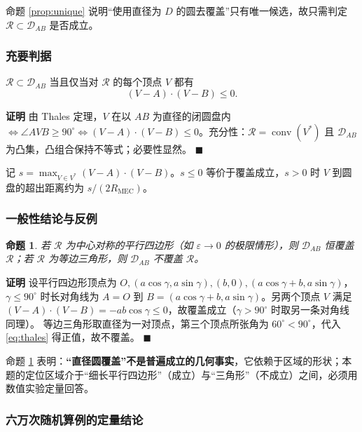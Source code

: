 \documentclass[withoutpreface,bwprint]{cumcmthesis}
\newtheorem{proposition}{\heiti 命题}
\newenvironment{pf}{\par\noindent\textbf{证明}\quad}{\hfill$\blacksquare$\par}
\begin{document}
命题 \ref{prop:unique} 说明“使用直径为 $D$ 的圆去覆盖”只有唯一候选，故只需判定 $\mathcal R\subset\mathcal D_{AB}$ 是否成立。

\subsubsection{充要判据}

\begin{theorem}[Thales 判据]\label{thm:thales}
$\mathcal R\subset\mathcal D_{AB}$ 当且仅当对 $\mathcal R$ 的每个顶点 $V$ 都有
\begin{equation}
(V-A)\cdot(V-B)\le0 .
\label{eq:thales}
\end{equation}
\end{theorem}
\begin{pf}
由 Thales 定理，$V$ 在以 $AB$ 为直径的闭圆盘内 $\iff\angle AVB\ge90^{\circ}\iff(V-A)\cdot(V-B)\le0$。充分性：$\mathcal R=\operatorname{conv}(V^*)$ 且 $\mathcal D_{AB}$ 为凸集，凸组合保持不等式；必要性显然。
\end{pf}

记 $s=\max_{V\in V^*}(V-A)\cdot(V-B)$。$s\le0$ 等价于覆盖成立，$s>0$ 时 $V$ 到圆盘的超出距离约为 $s/(2R_{\mathrm{MEC}})$。

\subsubsection{一般性结论与反例}

\begin{proposition}\label{prop:para}
若 $\mathcal R$ 为中心对称的平行四边形（如 $\varepsilon\to0$ 的极限情形），则 $\mathcal D_{AB}$ 恒覆盖 $\mathcal R$；若 $\mathcal R$ 为等边三角形，则 $\mathcal D_{AB}$ 不覆盖 $\mathcal R$。
\end{proposition}
\begin{pf}
设平行四边形顶点为 $O,(a\cos\gamma,a\sin\gamma),(b,0),(a\cos\gamma+b,a\sin\gamma)$，$\gamma\le90^{\circ}$ 时长对角线为 $A=O$ 到 $B=(a\cos\gamma+b,a\sin\gamma)$。另两个顶点 $V$ 满足 $(V-A)\cdot(V-B)=-ab\cos\gamma\le0$，故覆盖成立（$\gamma>90^{\circ}$ 时取另一条对角线同理）。
等边三角形取直径为一对顶点，第三个顶点所张角为 $60^{\circ}<90^{\circ}$，代入 \eqref{eq:thales} 得正值，故不覆盖。
\end{pf}

命题 \ref{prop:para} 表明：\textbf{“直径圆覆盖”不是普遍成立的几何事实}，它依赖于区域的形状；本题的定位区域介于“细长平行四边形”（成立）与“三角形”（不成立）之间，必须用数值实验定量回答。

\subsubsection{六万次随机算例的定量结论}
\end{document}
